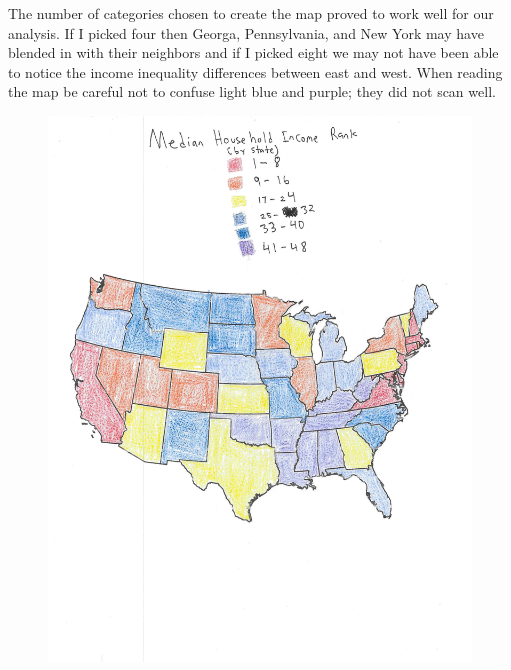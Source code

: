 \documentclass{article}
\begin{document}
The number of categories chosen to create the map proved to work well for our analysis. If I picked four then Georga, Pennsylvania, and New York may have blended in with their neighbors and if I picked eight we may not have been able to notice the income inequality differences between east and west. When reading the map be careful not to confuse light blue and purple; they did not scan well.

\begin{figure}[t]
\includegraphics[width=\textwidth]{map}
\end{figure}
\end{document}
